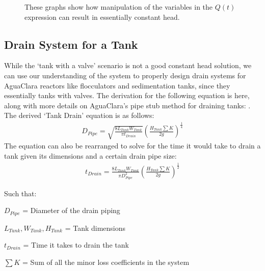 \documentclass[letterpaper,10pt,english]{sphinxmanual}
\let\sphinxpxdimen\pdfpxdimen\else\newdimen\sphinxpxdimen
\begin{document}
\begin{figure}[htbp]
\centering
\capstart

\noindent\sphinxincludegraphics[width=600\sphinxpxdimen]{{tank_valve_play}.png}
\caption{These graphs show how manipulation of the variables in the \(Q(t)\) expression can result in essentially constant head.}\label{\detokenize{Flow_Control_and_Measurement/FCM_Design:id14}}\label{\detokenize{Flow_Control_and_Measurement/FCM_Design:tank-valve-play}}\end{figure}


\subsection{Drain System for a Tank}
\label{\detokenize{Flow_Control_and_Measurement/FCM_Design:drain-system-for-a-tank}}\label{\detokenize{Flow_Control_and_Measurement/FCM_Design:id2}}
While the ‘tank with a valve’ scenario is not a good constant head solution, we can use our understanding of the system to properly design drain systems for AguaClara reactors like flocculators and sedimentation tanks, since they essentially tanks with valves. The derivation for the following equation is here, along with more details on AguaClara’s pipe stub method for draining tanks: {\hyperref[\detokenize{Flow_Control_and_Measurement/FCM_Derivations:diameter-and-time-tank-drain-equation}]{}}. The derived ‘Tank Drain’ equation is as follows:
\begin{equation}\label{equation:Flow_Control_and_Measurement/FCM_Design:Flow_Control_and_Measurement/FCM_Design:1}
\begin{split}D_{Pipe} = \sqrt{ \frac{8 L_{Tank} W_{Tank}}{\pi t_{Drain}}} {\left( \frac{H_{Tank} \sum K }{2g} \right)^{\frac{1}{4}}}\end{split}
\end{equation}
The equation can also be rearranged to solve for the time it would take to drain a tank given its dimensions and a certain drain pipe size:
\begin{equation}\label{equation:Flow_Control_and_Measurement/FCM_Design:Flow_Control_and_Measurement/FCM_Design:2}
\begin{split}t_{Drain} =  \frac{8 L_{Tank} W_{Tank}}{\pi D_{Pipe}^2} {\left( \frac{H_{Tank} \sum K }{2g} \right)^{\frac{1}{2}}}\end{split}
\end{equation}
\begin{DUlineblock}{0em}
\item[] Such that:
\item[] \(D_{Pipe}\) = Diameter of the drain piping
\item[] \(L_{Tank}, W_{Tank}, H_{Tank}\) = Tank dimensions
\item[] \(t_{Drain}\) = Time it takes to drain the tank
\item[] \(\sum K\) = Sum of all the minor loss coefficients in the system
\end{DUlineblock}
\end{document}
